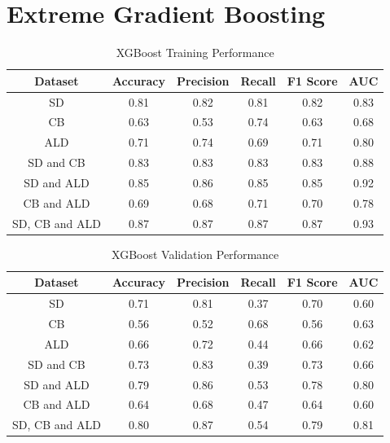 \vspace{10pt}




\section{Extreme Gradient Boosting}

\vspace{10pt}

\begin{table}[H]
\begin{center}
\begin{tabular}{|c|c|c|c|c|c|} 
\hline
\multicolumn{1}{|c|}{Dataset}
&\multicolumn{1}{|c|}{Accuracy}
&\multicolumn{1}{|c|}{Precision}
&\multicolumn{1}{|c|}{Recall}
&\multicolumn{1}{|c|}{F1 Score}
&\multicolumn{1}{|c|}{AUC}\\
\hline
SD & 0.81 & 0.82 & 0.81 & 0.82 & 0.83    \\
\hline
CB & 0.63 & 0.53 & 0.74 & 0.63 & 0.68    \\
\hline
ALD & 0.71 & 0.74 & 0.69 & 0.71 & 0.80    \\
\hline
SD and CB & 0.83 & 0.83 & 0.83 & 0.83 & 0.88    \\
\hline
SD and ALD & 0.85 & 0.86 & 0.85 & 0.85 & 0.92    \\
\hline
CB and ALD & 0.69 & 0.68 & 0.71 & 0.70 & 0.78    \\
\hline
SD, CB and ALD & 0.87 & 0.87 & 0.87 & 0.87 & 0.93    \\
\hline
\end{tabular}
\end{center}
\caption{XGBoost Training Performance}
\label{table:xgb training}
\end{table}

\vspace{10pt}

\begin{table}[H]
\begin{center}
\begin{tabular}{|c|c|c|c|c|c|} 
\hline
\multicolumn{1}{|c|}{Dataset}
&\multicolumn{1}{|c|}{Accuracy}
&\multicolumn{1}{|c|}{Precision}
&\multicolumn{1}{|c|}{Recall}
&\multicolumn{1}{|c|}{F1 Score}
&\multicolumn{1}{|c|}{AUC}\\
\hline
SD & 0.71 & 0.81 & 0.37 & 0.70 & 0.60    \\
\hline
CB & 0.56 & 0.52 & 0.68 & 0.56 & 0.63    \\
\hline
ALD & 0.66 & 0.72 & 0.44 & 0.66 & 0.62    \\
\hline
SD and CB & 0.73 & 0.83 & 0.39 & 0.73 & 0.66    \\
\hline
SD and ALD & 0.79 & 0.86 & 0.53 & 0.78 & 0.80    \\
\hline
CB and ALD & 0.64 & 0.68 & 0.47 & 0.64 & 0.60    \\
\hline
SD, CB and ALD & 0.80 & 0.87 & 0.54 & 0.79 & 0.81    \\
\hline
\end{tabular}
\end{center}
\caption{XGBoost Validation Performance}
\label{table:xgb test}
\end{table}

\vspace{10pt}